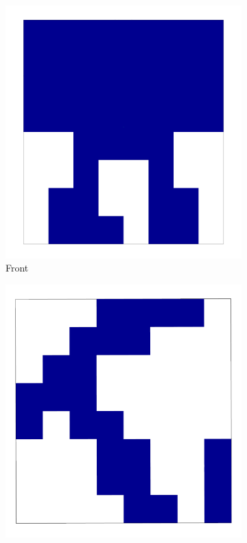 \begin{figure}[!htb]
	\centering
	\hfill
	\begin{subfigure}{0.325\textwidth}
		\centering
		\includegraphics[width=\linewidth]{Figures/ObjRecog/binary_front}
		\caption{Front}
		\label{subfig:objrecog:binary_occ:front}
	\end{subfigure}
	\hfill
	\begin{subfigure}{0.325\textwidth}
		\centering
		\includegraphics[width=\linewidth]{Figures/ObjRecog/binary_side}

\end{subfigure}
\end{figure}
